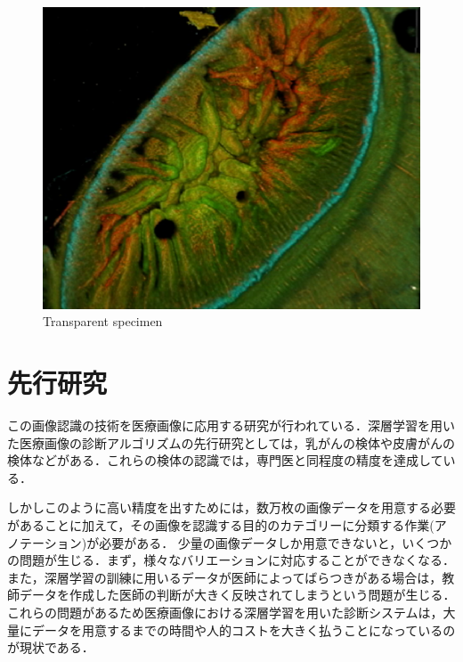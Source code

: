 \begin{figure}[H]
\begin{minipage}[b]{0.4\columnwidth}
		\includegraphics[clip, width=\linewidth]{fig/chapter1/colon_microscope}
	\end{minipage}
	\caption{Transparent specimen}
	\label{fig:lucid}
\end{figure}


\section{先行研究}\label{sec:先行研究}

この画像認識の技術を医療画像に応用する研究が行われている．深層学習を用いた医療画像の診断アルゴリズムの先行研究としては，乳がん\cite{wang2016deep}の検体や皮膚がん\cite{esteva2017dermatologist}の検体などがある．これらの検体の認識では，専門医と同程度の精度を達成している．

しかしこのように高い精度を出すためには，数万枚の画像データを用意する必要があることに加えて，その画像を認識する目的のカテゴリーに分類する作業(アノテーション)が必要がある．
少量の画像データしか用意できないと，いくつかの問題が生じる．まず，様々なバリエーションに対応することができなくなる．また，深層学習の訓練に用いるデータが医師によってばらつきがある場合は，教師データを作成した医師の判断が大きく反映されてしまうという問題が生じる．これらの問題があるため医療画像における深層学習を用いた診断システムは，大量にデータを用意するまでの時間や人的コストを大きく払うことになっているのが現状である．


